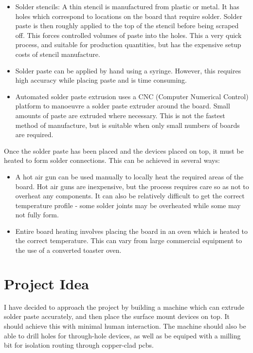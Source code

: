 \documentclass[a4paper,11pt]{article}  %
\begin{document}
\begin{itemize}
			\item	Solder stencils: A thin stencil is manufactured from plastic or metal. It has holes which correspond to locations on the board that require solder.
					Solder paste is then roughly applied to the top of the stencil before being scraped off. This forces controlled volumes of paste into the holes.
					This a very quick process, and suitable for production quantities, but has the expensive setup costs of stencil manufacture.
			\item	Solder paste can be applied by hand using a syringe. However, this requires high accuracy while placing paste and is time consuming.
			\item	Automated solder paste extrusion uses a CNC (Computer Numerical Control) platform to manoeuvre a solder paste extruder around the board. Small amounts of paste
					are extruded where necessary. This is not the fastest method of manufacture, but is suitable when only small numbers of boards are required.
\end{itemize}

Once the solder paste has been placed and the devices placed on top, it must be heated to form solder connections. This can be achieved in several ways:

\begin{itemize}
			\item	A hot air gun can be used manually to locally heat the required areas of the board. Hot air guns are inexpensive, but the process requires care so as not to overheat any
					components. It can also be relatively difficult to get the correct temperature profile - some solder joints may be overheated while some may not fully form.
			\item	Entire board heating involves placing the board in an oven which is heated to the correct temperature. This can vary from large commercial equipment to the use of a
					converted toaster oven.
\end{itemize}
			
\section{Project Idea}
I have decided to approach the project by building a machine which can extrude solder paste accurately, and then place
the surface mount devices on top. It should achieve this with minimal human interaction. The machine should also be able to
drill holes for through-hole devices, as well as be equiped with a milling bit for isolation routing through copper-clad pcbs.
\end{document}
